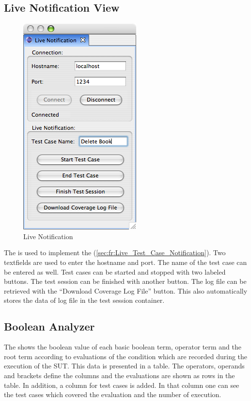 \subsection{Live Notification View}
\begin{figure}[hbt]
 \centering
 \includegraphics[scale=0.7]{images/Live_Notification/live_notification_view.png}
 \caption{Live Notification}
 \label{ui_fg:Live Notification}
\end{figure}
The  is used to implement the  (\ref{sec:fr:Live_Test_Case_Notification}). Two textfields are used to enter the hostname and port. The name of the test case can be entered as well. Test cases can be started and stopped with two labeled buttons. The test session can be finished with another button. The log file can be retrieved with the ``Download Coverage Log File'' button. This also automatically stores the data of log file in the test session container.

\subsection{Boolean Analyzer} \label{ui:Boolean Analyzer}
The  shows the boolean value of each basic boolean term, operator term and the root term according to evaluations of the condition which are recorded during the execution of the SUT. This data is presented in a table. The operators, operands and brackets define the columns and the evaluations are shown as rows in the table. In addition, a column for test cases is added. In that column one can see the test cases which covered the evaluation and the number of execution. 

